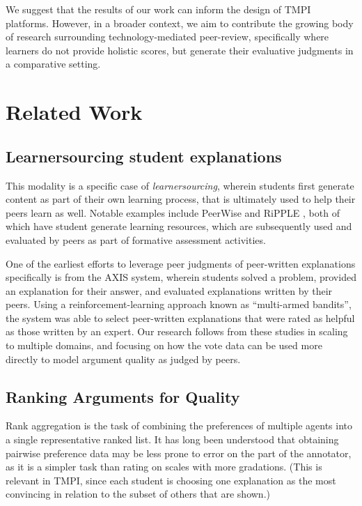 \documentclass[sigconf]{acmart}
\begin{document}
We suggest that the results of our work can inform the design of TMPI platforms.
However, in a broader context, we aim to contribute the growing body of 
research surrounding technology-mediated peer-review, specifically where 
learners do not provide holistic scores, but generate their evaluative 
judgments in a comparative setting.


\section{Related Work}

\subsection{Learnersourcing student explanations}
This modality is a specific case of  
\textit{learnersourcing}\cite{weir_learnersourcing_2015}, wherein students first
generate content as part of their own learning process, that is ultimately used 
to help their peers learn as well.
Notable examples include PeerWise \cite{denny_peerwise:_2008} and RiPPLE 
\cite{khosravi_ripple_2019}, both of which have student generate learning 
resources, which are subsequently used and evaluated by peers as part of 
formative assessment activities.

One of the earliest efforts to leverage peer judgments of peer-written 
explanations specifically is from the AXIS system\cite{williams_axis:_2016}, 
wherein students solved a problem, provided an explanation for their answer, 
and evaluated explanations written by their peers.
Using a reinforcement-learning approach known as ``multi-armed bandits'', the 
system was able to select peer-written explanations that were rated as helpful 
as those written by an expert.
Our research follows from these studies in scaling to multiple domains, and 
focusing on how the vote data can be used more directly to model argument 
quality as judged by peers.

\subsection{Ranking Arguments for Quality}
Rank aggregation is the task of combining the preferences of multiple agents 
into a single representative ranked list.
It has long been understood that obtaining pairwise preference data may be 
less prone to error on the part of the annotator, as it is a simpler task than 
rating on scales with more gradations. 
(This is relevant in TMPI, since each student is choosing one explanation as 
the most convincing in relation to the subset of others that are shown.)
 
\end{document}

